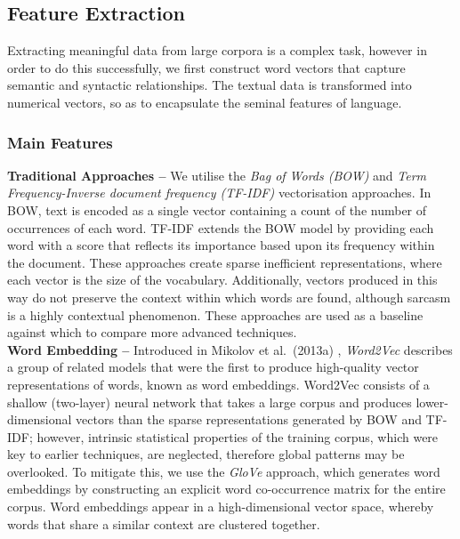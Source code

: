 \documentclass[12pt,a4paper]{article}
\begin{document}


\subsection{Feature Extraction}
\vspace{-4.2pt}
\noindent Extracting meaningful data from large corpora is a complex task, however in order to do this successfully, we first construct word vectors that capture semantic and syntactic relationships. The textual data is transformed into numerical vectors, so as to encapsulate the seminal features of language.\\

\subsubsection{Main Features}
\noindent \textbf{Traditional Approaches --} We utilise the \textit{Bag of Words (BOW)} and \textit{Term Frequency-Inverse document frequency (TF-IDF)} \cite{robertson1976relevance} vectorisation approaches. In BOW, text is encoded as a single vector containing a count of the number of occurrences of each word. TF-IDF extends the BOW model by providing each word with a score that reflects its importance based upon its frequency within the document. These approaches create sparse inefficient representations, where each vector is the size of the vocabulary. Additionally, vectors produced in this way do not preserve the context within which words are found, although sarcasm is a highly contextual phenomenon. These approaches are used as a baseline against which to compare more advanced techniques.\\

\noindent \textbf{Word Embedding --} Introduced in Mikolov et al.\ (2013a) \cite{mikolov2013efficient}, \textit{Word2Vec} describes a group of related models that were the first to produce high-quality vector representations of words, known as word embeddings. Word2Vec consists of a shallow (two-layer) neural network that takes a large corpus and produces lower-dimensional vectors than the sparse representations generated by BOW and TF-IDF; however, intrinsic statistical properties of the training corpus, which were key to earlier techniques, are neglected, therefore global patterns may be overlooked. To mitigate this, we use the \textit{GloVe} \cite{pennington2014glove} approach, which generates word embeddings by constructing an explicit word co-occurrence matrix for the entire corpus. Word embeddings appear in a high-dimensional vector space, whereby words that share a similar context are clustered together.\\
\end{document}
